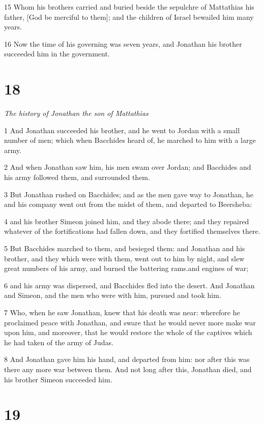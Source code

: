 15 Whom his brothers carried and buried beside the sepulchre of Mattathias his father, [God be merciful to them]; and the children of Israel bewailed him many years. 

16 Now the time of his governing was seven years, and Jonathan his brother succeeded him in the government. 

\chapter{18}

\par \textit{The history of Jonathan the son of Mattathias}

1 And Jonathan succeeded his brother, and he went to Jordan with a small number of men; which when Bacchides heard of, he marched to him with a large army. 

2 And when Jonathan saw him, his men swam over Jordan; and Bacchides and his army followed them, and surrounded them. 

3 But Jonathan rushed on Bacchides; and as the men gave way to Jonathan, he and his company went out from the midst of them, and departed to Beersheba: 

4 and his brother Simeon joined him, and they abode there; and they repaired whatever of the fortifications had fallen down, and they fortified themselves there.

5 But Bacchides marched to them, and besieged them: and Jonathan and his brother, and they which were with them, went out to him by night, and slew great numbers of his army, and burned the battering rams.and engines of war; 

6 and his army was dispersed, and Bacchides fled into the desert. And Jonathan and Simeon, and the men who were with him, pursued and took him. 

7 Who, when he saw Jonathan, knew that his death was near: wherefore he proclaimed peace with Jonathan, and sware that he would never more make war upon him, and moreover, that he would restore the whole of the captives which he had taken of the army of Judas. 

8 And Jonathan gave him his hand, and departed from him: nor after this was there any more war between them. And not long after this, Jonathan died, and his brother Simeon succeeded him. 


\chapter{19}

